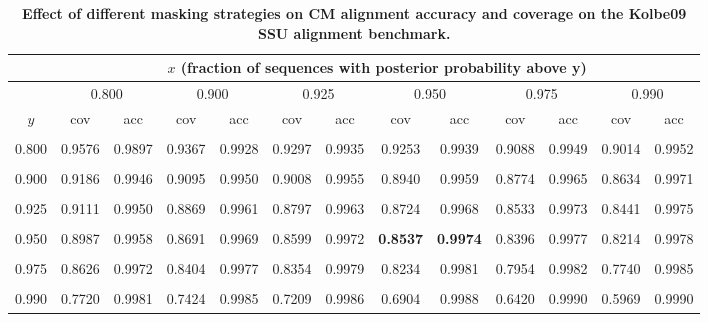 \begin{table}
\scriptsize
\begin{center}
\begin{tabular}{|c||cc|cc|cc|cc|cc|cc|}
\multicolumn{1}{c}{} & \multicolumn{12}{c}{$x$ (fraction of sequences with posterior probability above y)} \\ \hline
      & \multicolumn{2}{c|}{0.800} & \multicolumn{2}{c|}{0.900} & \multicolumn{2}{c|}{0.925} & \multicolumn{2}{c|}{0.950} & \multicolumn{2}{c|}{0.975} & \multicolumn{2}{c|}{0.990} \\ \cline{2-13}
 $y$  &     cov  & acc    &  cov    & acc     &  cov    & acc    &  cov    & acc    &     cov & acc    &      cov & acc    \\ \hline
& & & & & & & & & & & & \\
0.800 &   0.9576 & 0.9897 &  0.9367 & 0.9928  &  0.9297 & 0.9935 &  0.9253 & 0.9939 &  0.9088 & 0.9949 &   0.9014 & 0.9952 \\
& & & & & & & & & & & & \\
0.900 &   0.9186 & 0.9946 &  0.9095 & 0.9950  &  0.9008 & 0.9955 &  0.8940 & 0.9959 &  0.8774 & 0.9965 &   0.8634 & 0.9971 \\
& & & & & & & & & & & & \\
0.925 &   0.9111 & 0.9950 &  0.8869 & 0.9961  &  0.8797 & 0.9963 &  0.8724 & 0.9968 &  0.8533 & 0.9973 &   0.8441 & 0.9975 \\
& & & & & & & & & & & & \\
0.950 &   0.8987 & 0.9958 &  0.8691 & 0.9969  &  0.8599 & 0.9972 &  {\bf 0.8537} & {\bf 0.9974} &  0.8396 & 0.9977 &   0.8214 & 0.9978 \\
& & & & & & & & & & & & \\
0.975 &   0.8626 & 0.9972 &  0.8404 & 0.9977  &  0.8354 & 0.9979 &  0.8234 & 0.9981 &  0.7954 & 0.9982 &   0.7740 & 0.9985 \\
& & & & & & & & & & & & \\
0.990 &   0.7720 & 0.9981 &  0.7424 & 0.9985  &  0.7209 & 0.9986 &  0.6904 & 0.9988 &  0.6420 & 0.9990 &   0.5969 & 0.9990 \\ \hline
\end{tabular}
\end{center}
\caption[Effect of different masking strategies on CM alignment
  accuracy and coverage on the Kolbe09 SSU alignment benchmark]{
  \textbf{Effect of different masking strategies on CM alignment
  accuracy and coverage on the Kolbe09 SSU alignment benchmark.}
}
\end{table}
